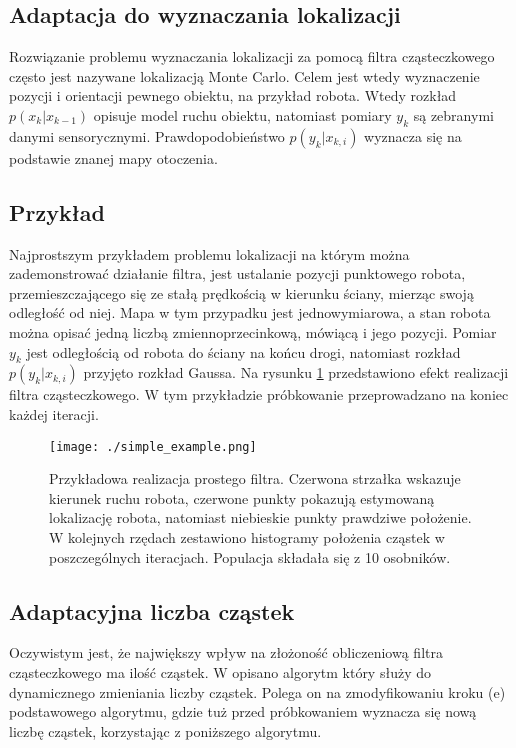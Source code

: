 \documentclass[10pt,a4paper]{article}
\begin{document}
\subsection{Adaptacja do wyznaczania lokalizacji}
Rozwiązanie problemu wyznaczania lokalizacji za pomocą filtra cząsteczkowego często jest nazywane lokalizacją Monte Carlo. Celem jest wtedy wyznaczenie pozycji i orientacji pewnego obiektu, na przykład robota. Wtedy rozkład $p(x_k|x_{k-1})$ opisuje model ruchu obiektu, natomiast pomiary $y_k$ są zebranymi danymi sensorycznymi. Prawdopodobieństwo $p(y_k|x_{k,i})$ wyznacza się na podstawie znanej mapy otoczenia.

\subsection{Przykład}
Najprostszym przykładem problemu lokalizacji na którym można zademonstrować działanie filtra, jest ustalanie pozycji punktowego robota, przemieszczającego się ze stałą prędkością w kierunku ściany, mierząc swoją odległość od niej. Mapa w tym przypadku jest jednowymiarowa, a stan robota można opisać jedną liczbą zmiennoprzecinkową, mówiącą i jego pozycji. Pomiar $y_k$ jest odległością od robota do ściany na końcu drogi, natomiast rozkład $p(y_k|x_{k,i})$ przyjęto rozkład Gaussa. Na rysunku \ref{simple_example} przedstawiono efekt realizacji filtra cząsteczkowego. W tym przykładzie próbkowanie przeprowadzano na koniec każdej iteracji.

\begin{figure}[H]\label{simple_example}
	\begin{center}
		\texttt{[image: ./simple\_example.png]}
		\caption{Przykładowa realizacja prostego filtra. Czerwona strzałka wskazuje kierunek ruchu robota, czerwone punkty pokazują estymowaną lokalizację robota, natomiast niebieskie punkty prawdziwe położenie. W kolejnych rzędach zestawiono histogramy położenia cząstek w poszczególnych iteracjach. Populacja składała się z 10 osobników.}
	\end{center}
\end{figure}

\subsection{Adaptacyjna liczba cząstek}
Oczywistym jest, że największy wpływ na złożoność obliczeniową filtra cząsteczkowego ma ilość cząstek. W \cite{adaptive} opisano algorytm który służy do dynamicznego zmieniania liczby cząstek. Polega on na zmodyfikowaniu kroku (e) podstawowego algorytmu, gdzie tuż przed próbkowaniem wyznacza się nową liczbę cząstek, korzystając z poniższego algorytmu.
\end{document}
